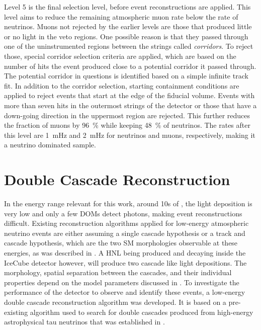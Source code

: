 Level 5 is the final selection level, before event reconstructions are applied. This level aims to reduce the remaining atmospheric muon rate below the rate of neutrinos. Muons not rejected by the earlier levels are those that produced little or no light in the veto regions. One possible reason is that they passed through one of the uninstrumented regions between the strings called \textit{corridors}. To reject those, special corridor selection criteria are applied, which are based on the number of hits the event produced close to a potential corridor it passed through. The potential corridor in questions is identified based on a simple infinite track fit. In addition to the corridor selection, starting containment conditions are applied to reject events that start at the edge of the fiducial volume. Events with more than seven hits in the outermost strings of the detector or those that have a down-going direction in the uppermost region are rejected. This further reduces the fraction of muons by \SI{96}{\percent} while keeping \SI{48}{\percent} of neutrinos. The rates after this level are \SI{1}{\milli\hertz} and \SI{2}{\milli\hertz} for neutrinos and muons, respectively, making it a neutrino dominated sample.



\section{Double Cascade Reconstruction} 

In the energy range relevant for this work, around 10s of \si{\gev}, the light deposition is very low and only a few DOMs detect photons, making event reconstructions difficult. Existing reconstruction algorithms applied for low-energy atmospheric neutrino events are either assuming a single cascade hypothesis or a track and cascade hypothesis, which are the two SM morphologies observable at these energies, as was described in . A HNL being produced and decaying inside the IceCube detector however, will produce two cascade like light depositions. The morphology, spatial separation between the cascades, and their individual properties depend on the model parameters discussed in . To investigate the performance of the detector to observe and identify these events, a low-energy double cascade reconstruction algorithm was developed. It is based on a pre-existing algorithm used to search for double cascades produced from high-energy astrophysical tau neutrinos  that was established in .


